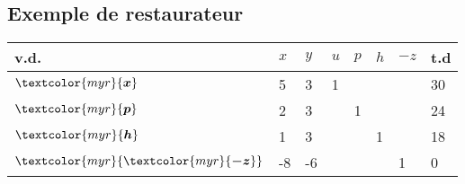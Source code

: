 \documentclass{report}
\begin{document}
\begin{multicols*}{2}
\section{Exemple de restaurateur}
         \begin{table}[H]
                \begin{center}
                    \renewcommand{\arraystretch}{1.5}
                    \selectfont
                    \footnotesize
                        \begin{tabular}{|l|l l l l l |l|l|}
                        \arrayrulecolor{blue}
                        \hline
                        v.d. & $x$
                             & $y$ & $u$ & $p$ & $h$ & $-z$ & t.d 
                        \\
                        \hline
                        \arrayrulecolor{black}
                        \rowcolor{myg!40}
                        $\textcolor{myr}{\boldsymbol{x}}$     
                                & 5
                                & 3
                                & 1
                                & 
                                & &  &  30
                        \\
                        $\textcolor{myr}{\boldsymbol{p}}$     
                               & 2
                               & 3
                               & & 1
                               & & & 24 
                        \\
                        $\textcolor{myr}{\boldsymbol{h}}$     
                               & 1
                               & 3 
                               &  & 
                               &  1
                               & & 18 
                        \\ 
                        \hline
                        $\textcolor{myr}{\textcolor{myr}{\boldsymbol{-z}}}$ 
                                & -8
                                & -6
                                & 
                                & 
                                & 
                                & 1 & 0 
                        \\
                        \hline 




\end{tabular}
\end{center}
\end{table}
\end{multicols*}
\end{document}
